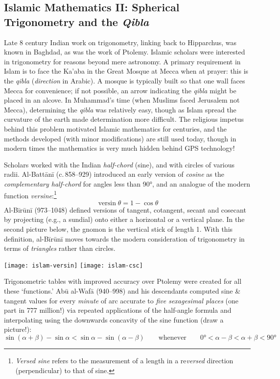 \clearpage



\subsection{Islamic Mathematics II: Spherical Trigonometry and the \emph{Qibla}}

Late 8\th{} century Indian work on trigonometry, linking back to Hipparchus, was known in Baghdad, as was the work of Ptolemy. Islamic scholars were interested in trigonometry for reasons beyond mere astronomy. A primary requirement in Islam is to face the Ka'aba in the Great Mosque at Mecca when at prayer: this is the \emph{qibla} (\emph{direction} in Arabic). A mosque is typically built so that one wall faces Mecca for convenience; if not possible, an arrow indicating the \emph{qibla} might be placed in an alcove. In Muhammad's time (when Muslims faced Jerusalem not Mecca), determining the \emph{qibla} was relatively easy, though as Islam spread the curvature of the earth made determination more difficult. The religious impetus behind this problem motivated Islamic mathematics for centuries, and the methods developed (with minor modifications) are still used today, though in modern times the mathematics is very much hidden behind GPS technology!



Scholars worked with the Indian \emph{half-chord} (sine), and with circles of various radii. Al-Battānī (c.\,858--929) introduced an early version of \emph{cosine} as the \emph{complementary half-chord} for angles less than \ang{90}, and an analogue of the modern function \emph{versine}:\footnote{%
	\emph{Versed sine} refers to the measurement of a length in a re\emph{versed} direction (perpendicular) to that of sine.%
}
\[
	\operatorname{versin}\theta=1-\cos\theta
\]
Al-Bīrūnī (973--1048) defined versions of tangent, cotangent, secant and cosecant by projecting (e.g., a sundial) onto either a horizontal or a vertical plane. In the second picture below, the gnomon is the vertical stick of length 1. With this definition, al-Bīrūnī moves towards the modern consideration of trigonometry in terms of \emph{triangles} rather than circles.
\begin{center}
  \texttt{[image: islam-versin]}\qquad\qquad
  \texttt{[image: islam-csc]}
\end{center}\label{pg:sineconcave}

Trigonometric tables with improved accuracy over Ptolemy were created for all these `functions.' Abū al-Wafā (940--998) and his descendants computed sine \& tangent values for every \emph{minute} of arc accurate to \emph{five sexagesimal places} (one part in 777 million!) via repeated applications of the half-angle formula and interpolating using the downwards concavity of the sine function (draw a picture!):
\[
	\sin(\alpha+\beta)-\sin\alpha<\sin\alpha-\sin(\alpha-\beta)
	\qquad\text{whenever}\qquad
	\ang{0}<\alpha-\beta<\alpha+\beta<\ang{90}
\]

